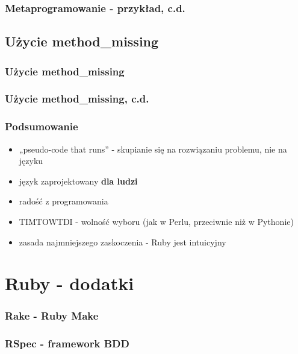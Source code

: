\documentclass[12t]{beamer}
\begin{document}
\begin{frame}[fragile]
  \frametitle{Metaprogramowanie - przykład, c.d.}
  
\end{frame}

\subsection{Użycie method\_missing}
\begin{frame}[fragile]
  \frametitle{Użycie method\_missing}
  
\end{frame}

\begin{frame}[fragile]
  \frametitle{Użycie method\_missing, c.d.}
  
\end{frame}

\begin{frame}
  \frametitle{Podsumowanie}
  \begin{itemize}
  \item „pseudo-code that runs” - skupianie się na rozwiązaniu
    problemu, nie na języku
  \item język zaprojektowany \textbf{dla ludzi}
  \item radość z programowania
  \item TIMTOWTDI - wolność wyboru (jak w Perlu, przeciwnie niż w
    Pythonie)
  \item zasada najmniejszego zaskoczenia - Ruby jest intuicyjny
  \end{itemize}
\end{frame}

\section{Ruby - dodatki}
\begin{frame}[fragile]
  \frametitle{Rake - Ruby Make}
  \begin{footnotesize}
    
  \end{footnotesize}
\end{frame}

\begin{frame}[fragile]
  \frametitle{RSpec - framework BDD}
  \begin{footnotesize}
    
  \end{footnotesize}
\end{frame}
\end{document}

